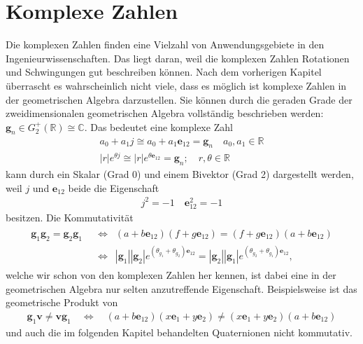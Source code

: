 %
%
%
\section{Komplexe Zahlen}

Die komplexen Zahlen finden eine Vielzahl von Anwendungsgebiete in den Ingenieurwissenschaften. Das liegt daran, weil die komplexen Zahlen Rotationen und Schwingungen gut beschreiben können. Nach dem vorherigen Kapitel überrascht es wahrscheinlich nicht viele, dass es möglich ist komplexe Zahlen in der geometrischen Algebra darzustellen. Sie können durch die geraden Grade der zweidimensionalen geometrischen Algebra vollständig beschrieben werden: $\mathbf{g}_n \in G_2^+(\mathbb{R}) \cong \mathbb{C}$. Das bedeutet eine komplexe Zahl 
\begin{align}
	a_0 + a_1 j \cong a_0 + a_1 \mathbf{e}_{12} = \mathbf{g}_n\quad a_0, a_1 \in \mathbb{R}\\
	|r|e^{\theta j} \cong |r|e^{\theta \mathbf{e}_{12}} = \mathbf{g}_n; \quad r, \theta \in \mathbb{R}
\end{align}
kann durch ein Skalar (Grad 0) und einem Bivektor (Grad 2) dargestellt werden, weil $j$ und $\mathbf{e}_{12}$ beide die Eigenschaft
\begin{align}
	j^2 = -1\quad \mathbf{e}_{12}^2 = -1
\end{align}
besitzen. Die Kommutativität
\begin{align}
	\begin{split}
		\mathbf{g}_1\mathbf{g}_2 = \mathbf{g}_2\mathbf{g}_1 \enspace&\Leftrightarrow\enspace (a + b \mathbf{e}_{12})(f + g \mathbf{e}_{12}) = (f + g \mathbf{e}_{12})(a + b \mathbf{e}_{12})\\ &\Leftrightarrow\enspace |\mathbf{g}_1||\mathbf{g}_2|e^{(\theta_{g_1} + \theta_{g_2})\mathbf{e}_{12}} =  |\mathbf{g}_2||\mathbf{g}_1|e^{(\theta_{g_2} + \theta_{g_1})\mathbf{e}_{12}},
	\end{split}
\end{align}
welche wir schon von den komplexen Zahlen her kennen, ist dabei eine in der geometrischen Algebra nur selten anzutreffende Eigenschaft. Beispielsweise ist das geometrische Produkt von
\begin{align}
	\mathbf{g}_1\mathbf{v}\not= \mathbf{v}\mathbf{g}_1 \quad\Leftrightarrow\quad(a + b \mathbf{e}_{12})(x\mathbf{e}_1+y\mathbf{e}_2)\not= (x\mathbf{e}_1+y\mathbf{e}_2)(a + b \mathbf{e}_{12})
\end{align}
und auch die im folgenden Kapitel behandelten Quaternionen nicht kommutativ.

